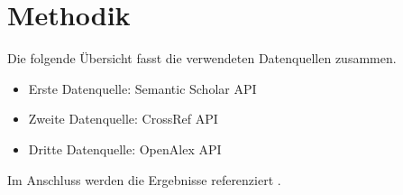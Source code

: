 \chapter{Methodik}

Die folgende Übersicht fasst die verwendeten Datenquellen zusammen.

\begin{itemize}
\tightlist
\item Erste Datenquelle: Semantic Scholar API
\item Zweite Datenquelle: CrossRef API
\item Dritte Datenquelle: OpenAlex API
\end{itemize}

Im Anschluss werden die Ergebnisse referenziert \cite{smith2020}.
